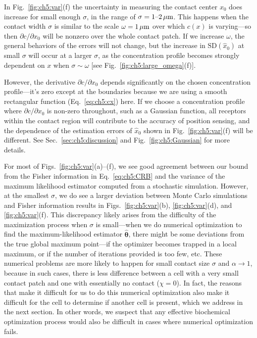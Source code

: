 In Fig.~\ref{fig:ch5:var}(f) the uncertainty in measuring the contact center $x_0$ does increase for small enough $\sigma$, in the range of $\sigma = 1\textrm{--}2 \,\rm{\mu m}$.
This happens when the contact width $\sigma$ is similar to the scale $\omega = 1\,\rm{\mu m}$ over which $c(x)$ is varying---so then $\partial c/\partial x_0$ will be nonzero over the whole contact patch.
If we increase $\omega$, the general behaviors of the errors will not change, but the increase in $\textrm{SD}(\hat{x}_0)$ at small $\sigma$ will occur at a larger $\sigma$, as the concentration profile becomes strongly dependent on $x$ when $\sigma \sim \omega$ [see Fig.~\ref{fig:ch5:large_omega}(f)].

However, the derivative $\partial c/\partial x_0$ depends significantly on the chosen concentration profile---it's zero except at the boundaries because we are using a smooth rectangular function (Eq.~\eqref{eq:ch5:cx}) here.
If we choose a concentration profile where $\partial c/\partial x_0$ is non-zero throughout, such as a Gaussian function, all receptors within the contact region will contribute to the accuracy of position sensing, and the dependence of the estimation errors of $\hat{x}_0$ shown in Fig.~\ref{fig:ch5:var}(f) will be different.
See Sec.~\ref{sec:ch5:discussion} and Fig.~\ref{fig:ch5:Gaussian} for more details.

For most of Figs.~\ref{fig:ch5:var}(a)--(f), we see good agreement between our bound from the Fisher information in Eq.~\eqref{eq:ch5:CRB} and the variance of the maximum likelihood estimator computed from a stochastic simulation.
However, at the smallest $\sigma$, we do see a larger deviation between Monte Carlo simulations and Fisher information results in Figs.~\ref{fig:ch5:var}(b), \ref{fig:ch5:var}(d), and \ref{fig:ch5:var}(f).
This discrepancy likely arises from the difficulty of the maximization process when $\sigma$ is small---when we do numerical optimization to find the maximum-likelihood estimator $\hat{\boldsymbol{\theta}}$, there might be some deviations from the true global maximum point---if the optimizer becomes trapped in a local maximum, or if the number of iterations provided is too few, etc.
These numerical problems are more likely to happen for small contact size $\sigma$ and $\alpha \to 1$, because in such cases, there is less difference between a cell with a very small contact patch and one with essentially no contact ($\chi = 0$).
In fact, the reasons that make it difficult for us to do this numerical optimization also make it difficult for the cell to determine if another cell is present, which we address in the next section.
In other words, we suspect that any effective biochemical optimization process would also be difficult in cases where numerical optimization fails.


